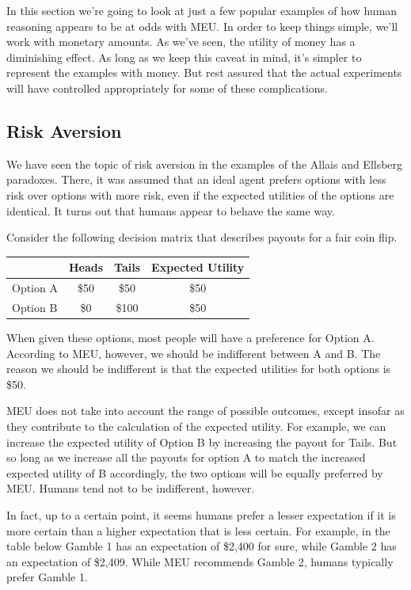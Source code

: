 \documentclass[]{tufte-book}
\begin{document}
In this section we're going to look at just a few popular examples of how human reasoning appears to be at odds with MEU. In order to keep things simple, we'll work with monetary amounts. As we've seen, the utility of money has a diminishing effect. As long as we keep this caveat in mind, it's simpler to represent the examples with money. But rest assured that the actual experiments will have controlled appropriately for some of these complications.

\hypertarget{risk-aversion}{%
\subsection{Risk Aversion}\label{risk-aversion}}

We have seen the topic of risk aversion in the examples of the Allais and Ellsberg paradoxes. There, it was assumed that an ideal agent prefers options with less risk over options with more risk, even if the expected utilities of the options are identical. It turns out that humans appear to behave the same way.

Consider the following decision matrix that describes payouts for a fair coin flip.

\begin{longtable}[]{@{}lccc@{}}
\toprule
& Heads & Tails & Expected Utility\tabularnewline
\midrule
\endhead
Option A & \$50 & \$50 & \$50\tabularnewline
Option B & \$0 & \$100 & \$50\tabularnewline
\bottomrule
\end{longtable}

When given these options, most people will have a preference for Option A. According to MEU, however, we should be indifferent between A and B. The reason we should be indifferent is that the expected utilities for both options is \$50.

MEU does not take into account the range of possible outcomes, except insofar as they contribute to the calculation of the expected utility. For example, we can increase the expected utility of Option B by increasing the payout for Tails. But so long as we increase all the payouts for option A to match the increased expected utility of B accordingly, the two options will be equally preferred by MEU. Humans tend not to be indifferent, however.

In fact, up to a certain point, it seems humans prefer a lesser expectation if it is more certain than a higher expectation that is less certain. For example, in the table below Gamble 1 has an expectation of \$2,400 for sure, while Gamble 2 has an expectation of \$2,409. While MEU recommends Gamble 2, humans typically prefer Gamble 1.
\end{document}
